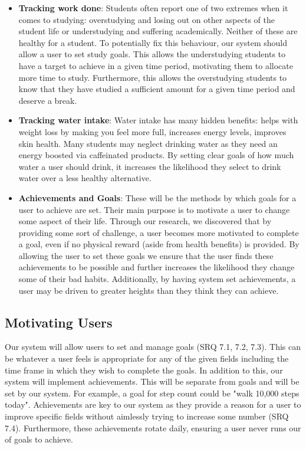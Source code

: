 \documentclass[12pt]{article}
\begin{document}
\begin{itemize}
    \item \textbf{Tracking work done}: Students often report one of two
        extremes when it comes to studying: overstudying and losing out on
        other aspects of the student life or understudying and suffering
        academically. Neither of these are healthy for a student. To
        potentially fix this behaviour, our system should allow a user to set
        study goals. This allows the understudying students to have a target to
        achieve in a given time period, motivating them to allocate more time
        to study. Furthermore, this allows the overstudying students to know
        that they have studied a sufficient amount for a given time period and
        deserve a break.
    
    \item \textbf{Tracking water intake}: Water intake has many hidden
        benefits: helps with weight loss by making you feel more full,
        increases energy levels, improves skin health. Many students may
        neglect drinking water as they need an energy boosted via caffeinated
        products. By setting clear goals of how much water a user should drink,
        it increases the likelihood they select to drink water over a less
        healthy alternative.

    \item \textbf{Achievements and Goals}: These will be the methods by which goals for a
        user to achieve are set. Their main purpose is to motivate a user to
        change some aspect of their life. Through our research, we discovered
        that by providing some sort of challenge, a user becomes more motivated
        to complete a goal, even if no physical reward (aside from health
        benefits) is provided. By allowing the user to set these goals we
        ensure that the user finds these achievements to be possible and
        further increases the likelihood they change some of their bad habits.
        Additionally, by having system set achievements, a user may be driven to
        greater heights than they think they can achieve.

\end{itemize}


\subsection{Motivating Users}

Our system will allow users to set and manage goals (SRQ 7.1, 7.2, 7.3). This can be whatever a user feels is appropriate for any of the given 
fields including the time frame in which they wish to complete the goals. In addition to this, our system will implement achievements.
This will be separate from goals and will be set by our system. For example, a goal for step count could be "walk 10,000 steps today".
Achievements are key to our system as they provide a reason for a user to improve specific fields
without aimlessly trying to increase some number (SRQ 7.4). Furthermore, these
achievements rotate daily, ensuring a user never runs our of goals to achieve.\\
\end{document}

